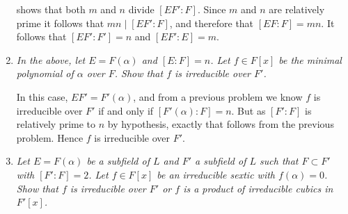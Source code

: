 \documentclass[10pt]{article}
\begin{document}
\begin{enumerate}
shows that both $m$ and $n$ divide $[EF':F]$.  Since $m$ and $n$ are relatively prime it follows that $mn \mid [EF':F]$, and therefore that $[EF:F] = mn$.  It follows that $[EF':F'] = n$ and $[EF':E] = m$.

\item \emph{In the above, let $E = F(\alpha)$ and $[E:F] = n$.  Let $f \in F[x]$ be the minimal polynomial of $\alpha$ over $F$.  Show that $f$ is irreducible over $F'$.}

In this case, $EF' = F'(\alpha)$, and from a previous problem we know $f$ is irreducible over $F'$ if and only if $[F'(\alpha):F] = n$.  But as $[F':F]$ is relatively prime to $n$ by hypothesis, exactly that follows from the previous problem.  Hence $f$ is irreducible over $F'$.

\item \emph{Let $E = F(\alpha)$ be a subfield of $L$ and $F'$ a subfield of $L$ such that $F \subset F'$ with $[F':F] = 2$.  Let $f \in F[x]$ be an irreducible sextic with $f(\alpha) = 0$.  Show that $f$ is irreducible over $F'$ or $f$ is a product of irreducible cubics in $F'[x]$.}

\end{enumerate}
\end{document}
